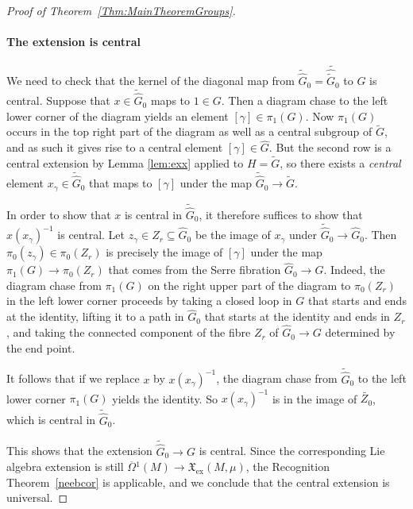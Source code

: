 \documentclass{article}
\newcommand{\ex}{\mathrm{ex}}
\newcommand{\oline}{\overline}
\theoremstyle{definition}
\begin{document}
\begin{proof}[Proof of Theorem~\ref{Thm:MainTheoremGroups}]
\paragraph{The extension is central}
We need to check that the kernel of the diagonal map from $\widetilde{\hat{G}}_0 = \widetilde{\hat{\tilde{G}}_0}$ to $G$ is central.
Suppose that $x \in \widetilde{\hat{G}}_0$ maps to $1\in G$. Then a diagram chase to the left lower corner of the diagram yields an element 
$[\gamma] \in \pi_1(G)$. Now $\pi_1(G)$ occurs in the top right part of the diagram as well as a central subgroup of $\widetilde{G}$, and as such 
it gives rise to a central element $[\gamma] \in \widehat{G}$.
But the second row is a central extension by Lemma \ref{lem:exx} applied to $H = \widetilde{G}$, 
so there exists a \emph{central} element $x_{\gamma} \in \widetilde{\hat{G}}_0$ that maps to $[\gamma]$ under the map 
$\widetilde{\hat{G}}_0 \rightarrow \widetilde{G}$.

In order to show that $x$ is central in $\widetilde{\hat{G}}_0$, it therefore suffices to show that $x (x_{\gamma})^{-1}$ is central.
Let $z_{\gamma} \in Z_r \subseteq \widehat{G}_0$ be the image of $x_{\gamma}$ under $\widetilde{\hat{G}}_0 \rightarrow \widehat{G}_0$.
Then $\pi_0(z_{\gamma}) \in \pi_0(Z_r)$ is precisely the image of $[\gamma]$ under the map $\pi_1(G) \rightarrow \pi_0(Z_r)$
that comes from the Serre fibration $\widehat{G}_0 \rightarrow G$. 
Indeed, the diagram chase from $\pi_1(G)$ on the right upper part of the diagram to $\pi_0(Z_r)$ in the left lower corner proceeds by
taking a closed loop in $G$ that starts and ends at the identity, lifting it to a path in $\widehat{G}_{0}$ that starts at the identity and ends in $Z_r$, 
and taking the connected component of the fibre $Z_r$ of $\widehat{G}_{0} \rightarrow G$ determined by the end point. 

It follows that if we replace $x$ by $x (x_{\gamma})^{-1}$, the diagram chase from $\widetilde{\hat{G}}_0$ to the left lower corner 
$\pi_1(G)$ yields the identity. So $x (x_{\gamma})^{-1}$ is in the image of $\widetilde{Z_0}$, which is central in $\widetilde{\hat{G}}_0$.

This shows that the extension $\widetilde{\hat{G}}_0 \rightarrow G$ is central. Since the corresponding Lie algebra extension 
is still $\oline{\Omega}{}^1(M) \rightarrow \mathfrak X_{\ex}(M,\mu)$, the Recognition Theorem~\ref{neebcor} is applicable,
and we conclude that the central extension is universal. 
\end{proof}
\end{document}
